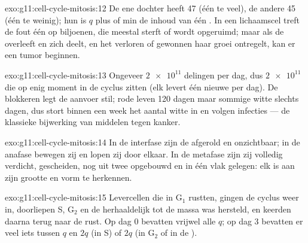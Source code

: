 \begin{solution}{exo:g11:cell-cycle-mitosis:12}
De ene dochter heeft 47  (één te veel), de andere 45 (één te
weinig); hun  is $q$ plus of min de inhoud van één . In een
lichaamscel treft de fout één  op biljoenen, die meestal sterft of
wordt opgeruimd; maar als de  overleeft en zich deelt, en het verloren
of gewonnen  haar groei ontregelt, kan er een tumor beginnen.
\end{solution}

\begin{solution}{exo:g11:cell-cycle-mitosis:13}
Ongeveer $\num{2e11}$ delingen per dag, dus $\num{2e11}$  die op
enig moment in de cyclus zitten (elk levert één nieuwe  per dag). De
 blokkeren legt de aanvoer stil; rode  leven 120 dagen maar
sommige witte slechts dagen, dus stort binnen een week het aantal witte
 in en volgen infecties --- de klassieke bijwerking van middelen
tegen kanker.
\end{solution}

\begin{solution}{exo:g11:cell-cycle-mitosis:14}
In de interfase zijn de  afgerold en onzichtbaar; in de
anafase bewegen zij en lopen zij door elkaar. In de metafase zijn zij
volledig verdicht, gescheiden, nog uit twee  opgebouwd en in
één vlak gelegen: elk is aan zijn grootte en vorm te herkennen.
\end{solution}

\begin{solution}{exo:g11:cell-cycle-mitosis:15}
Levercellen die in $\mathrm{G_1}$ rustten, gingen de cyclus weer in,
doorliepen S, $\mathrm{G_2}$ en de  herhaaldelijk tot de massa was
hersteld, en keerden daarna terug naar de rust. Op dag 0 bevatten vrijwel
alle  $q$; op dag 3 bevatten er veel iets tussen $q$ en $2q$ (in S)
of $2q$ (in $\mathrm{G_2}$ of in de ).
\end{solution}

